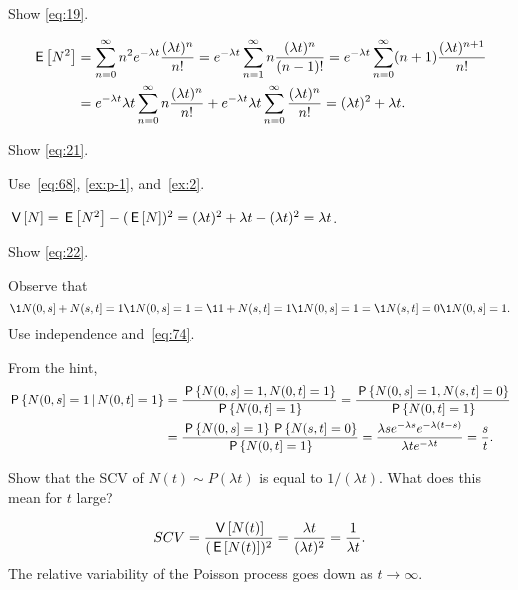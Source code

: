 \begin{exercise}\label{ex:p-1}
 Show \cref{eq:19}.
\begin{solution}
 \begin{align*}
 \,\mathsf{E}\left[N^2\right]
&= \sum_{n=0}^\infty n^2 e^{-\lambda t}\frac{(\lambda t)^n}{n!}
= e^{-\lambda t} \sum_{n=1}^\infty n \frac{(\lambda t)^n}{(n-1)!}
= e^{-\lambda t} \sum_{n=0}^\infty (n+1) \frac{(\lambda t)^{n+1}}{n!} \\
&= e^{-\lambda t} \lambda t \sum_{n=0}^\infty n \frac{(\lambda t)^{n}}{n!} +e^{-\lambda t}\lambda t \sum_{n=0}^\infty\frac{(\lambda t)^{n}}{n!}
= (\lambda t)^2 + \lambda t.
\end{align*}
\end{solution}
\end{exercise}

\begin{exercise}\label{ex:pe-53}
 Show \cref{eq:21}.
\begin{hint} Use~\cref{eq:68}, \cref{ex:p-1},  and~\cref{ex:2}.
\end{hint}
\begin{solution}
$\,\mathsf{V}\left[N\right] = \,\mathsf{E}\left[N^2\right] - (\,\mathsf{E}\left[N\right])^2 = (\lambda t)^2 + \lambda t - (\lambda t)^2 = \lambda t$.
\end{solution}
\end{exercise}


\begin{exercise}\label{ex:p-36}
 Show \cref{eq:22}.
\begin{hint}
 Observe that
 \begin{equation*}
\1{N(0,s]+N(s,t]=1}\1{N(0,s]=1} = \1{1+N(s,t]=1}\1{N(0,s]=1}=\1{N(s,t]=0}\1{N(0,s]=1}.
 \end{equation*}
Use independence and~\cref{eq:74}.
\end{hint}
\begin{solution}
From the hint,
\begin{align*}
 \,\mathsf{P}\left\{N(0,s] =1\,\middle|\, N(0,t]=1\right\}
&= \frac{\,\mathsf{P}\left\{N(0,s] =1, N(0,t]=1\right\}}{\,\mathsf{P}\left\{N(0,t]=1\right\}}
= \frac{\,\mathsf{P}\left\{N(0,s] =1, N(s,t]=0\right\}}{\,\mathsf{P}\left\{N(0,t]=1\right\}} \\
&= \frac{\,\mathsf{P}\left\{N(0,s] =1\right\}\,\mathsf{P}\left\{N(s,t]=0\right\}}{\,\mathsf{P}\left\{N(0,t]=1\right\}} = \frac{\lambda s e^{-\lambda s} e^{-\lambda (t-s)}}{\lambda t e^{-\lambda t}} = \frac s t.
\end{align*}
\end{solution}
\end{exercise}


\begin{exercise} \label{ex:l-102}
 Show that the SCV of $N(t)\sim P(\lambda t)$ is equal to $1/(\lambda t)$. What does this mean for $t$ large?
\begin{solution}
 \begin{equation*}
SCV = \frac{\,\mathsf{V}\left[N(t)\right]}{(\,\mathsf{E}\left[N(t)\right])^2} = \frac{\lambda t}{(\lambda t)^2} = \frac1{\lambda t}.
 \end{equation*}
The relative variability of the Poisson process goes down as $t\to\infty$.
\end{solution}
\end{exercise}



